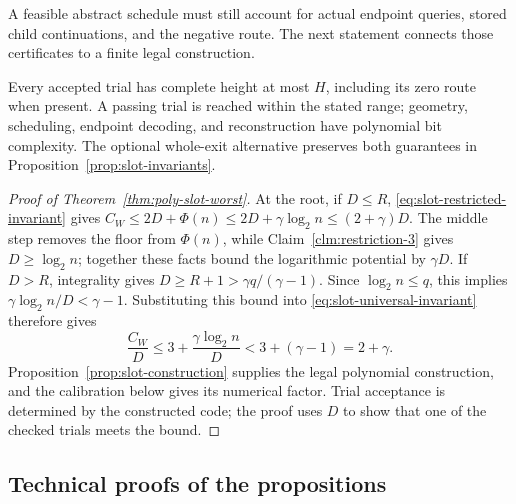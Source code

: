 A feasible abstract schedule must still account for actual endpoint
queries, stored child continuations, and the negative route. The next
statement connects those certificates to a finite legal construction.

\begin{proposition}
\label{prop:slot-construction}
Every accepted trial has complete height at most $H$, including its
zero route when present. A passing trial is reached within the stated
range; geometry, scheduling, endpoint decoding, and reconstruction
have polynomial bit complexity. The optional whole-exit alternative
preserves both guarantees in Proposition~\ref{prop:slot-invariants}.
\end{proposition}

\begin{proof}[Proof of Theorem~\ref{thm:poly-slot-worst}]
At the root, if $D\le R$, \eqref{eq:slot-restricted-invariant} gives
$C_W\le2D+\Phi(n)\le2D+\gamma\log_2n\le(2+\gamma)D$.
The middle step removes the floor from $\Phi(n)$, while
Claim~\ref{clm:restriction-3} gives $D\ge\log_2n$; together these
facts bound the logarithmic potential by $\gamma D$.
If $D>R$, integrality gives
$D\ge R+1>\gamma q/(\gamma-1)$. Since $\log_2n\le q$,
this implies $\gamma\log_2n/D<\gamma-1$.
Substituting this bound into \eqref{eq:slot-universal-invariant} therefore gives
\[
 \frac{C_W}{D}\le3+\frac{\gamma\log_2n}{D}
 <3+(\gamma-1)=2+\gamma.
\]
Proposition~\ref{prop:slot-construction} supplies the legal
polynomial construction, and the calibration below gives its numerical
factor. Trial acceptance is determined by the constructed code; the
proof uses $D$ to show that one of the checked trials meets the bound.
\end{proof}

\subsection{Technical proofs of the propositions}

